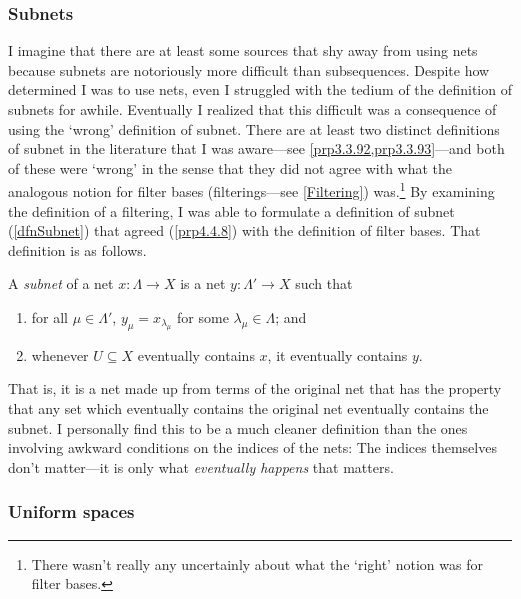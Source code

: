 \subsubsection{Subnets}

I imagine that there are at least some sources that shy away from using nets because subnets are notoriously more difficult than subsequences.  Despite how determined I was to use nets, even I struggled with the tedium of the definition of subnets for awhile.  Eventually I realized that this difficult was a consequence of using the `wrong' definition of subnet.  There are at least two distinct definitions of subnet in the literature that I was aware---see \cref{prp3.3.92,prp3.3.93}---and both of these were `wrong' in the sense that they did not agree with what the analogous notion for filter bases (filterings---see \cref{Filtering}) was.\footnote{There wasn't really any uncertainly about what the `right' notion was for filter bases.}  By examining the definition of a filtering, I was able to formulate a definition of subnet (\cref{dfnSubnet}) that agreed (\cref{prp4.4.8}) with the definition of filter bases.  That definition is as follows.
\begin{displayquote}
A \emph{subnet} of a net $x:\Lambda \rightarrow X$ is a net $y:\Lambda '\rightarrow X$ such that
\begin{enumerate}
\item for all $\mu \in \Lambda '$, $y_\mu =x_{\lambda _\mu}$ for some $\lambda _\mu \in \Lambda$; and
\item whenever $U\subseteq X$ eventually contains $x$, it eventually contains $y$.
\end{enumerate}
\end{displayquote}
That is, it is a net made up from terms of the original net that has the property that any set which eventually contains the original net eventually contains the subnet.  I personally find this to be a much cleaner definition than the ones involving awkward conditions on the indices of the nets:  The indices themselves don't matter---it is only what \emph{eventually happens} that matters.

\subsubsection{Uniform spaces}


